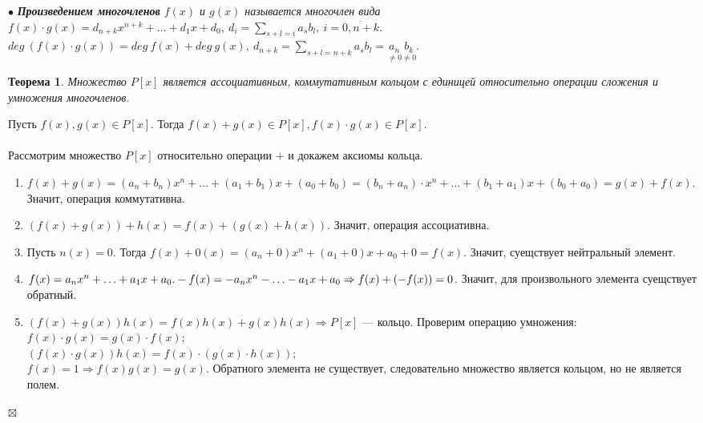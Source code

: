 \documentclass[a4paper, 12pt]{report}
\newenvironment{Proof} %
{\par\noindent{$\blacklozenge$}} %
{\hfill$\scriptstyle\boxtimes$}
\begin{document}
$\bullet$\textit{ \textbf{Произведением многочленов} $f(x)$ и $g(x)$ называется многочлен вида $f(x)\cdot g(x) = d_{n+k}x^{n+k} + \ldots + d_1x + d_0,\ d_i = \sum_{s+l=i}a_sb_l,\ i = \overline{0,n+k}.$\\
$deg\ (f(x)\cdot g(x)) = deg\ f(x) + deg\ g(x),\ d_{n+k} = \sum_{s+l=n+k} a_sb_l = \underset{\ne0}{a_n}\underset{\ne 0}{b_k}.$}
\newtheorem*{th29}{Теорема}\begin{th29}
	Множество $P[x]$ является ассоциативным, коммутативным кольцом с единицей относительно операции сложения и умножения многочленов.
\end{th29}\begin{Proof} Пусть $f(x), g(x) \in P[x]$. Тогда $f(x) + g(x) \in P[x], f(x)\cdot g(x)\in P[x]$.\\\\
Рассмотрим множество $P[x]$ относительно операции $+$ и докажем аксиомы кольца.\begin{enumerate}
	\item $f(x) + g(x) = (a_n + b_n)x^n + \ldots + (a_1 + b_1) x + (a_0 + b_0) = (b_n + a_n)\cdot x^n + \ldots + (b_1 + a_1)x + (b_0 + a_0) = g(x) + f(x).$ Значит, операция коммутативна.
	\item $(f(x) + g(x)) + h(x) = f(x) + (g(x) + h(x))$. Значит, операция ассоциативна.
	\item Пусть $n(x) = 0$. Тогда $f(x) + 0(x) = (a_n + 0)x^n + (a_1 + 0)x + a_0 + 0 = f(x).$ Значит, суещствует нейтральный элемент.
	\item $f(x) = a_nx^n + \ldots + a_1 x + a_0.\\
	-f(x) = -a_nx^n - \ldots - a_1 x + a_0\Rightarrow f(x) + (-f(x)) = 0$. Значит, для произвольного элемента суещствует обратный.
	\item $(f(x) + g(x))h(x) = f(x)h(x) + g(x)h(x) \Rightarrow P[x]$ --- кольцо. Проверим операцию умножения: \\$f(x)\cdot g(x) = g(x)\cdot f(x);$\\
	$(f(x)\cdot g(x))h(x) = f(x) \cdot (g(x)\cdot h(x));$\\
	$f(x) = 1 \Rightarrow f(x)g(x) = g(x)$. Обратного элемента не существует, следовательно множество является кольцом, но не является полем.
\end{enumerate}
\end{Proof}\\
\end{document}
